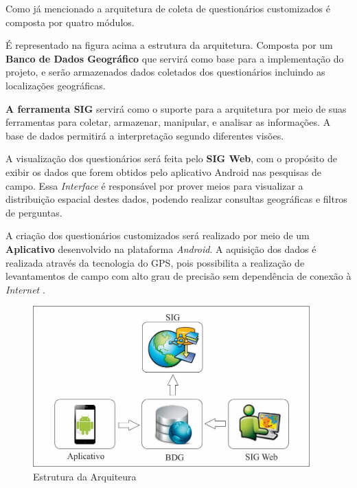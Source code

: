 \documentclass[
	12pt,				%
    oneside,			%
	a4paper,			%
	english,			%
	french,				%
	spanish,			%
	brazil,				%
	]{abntex2}
\begin{document}
Como já mencionado a arquitetura de coleta de questionários customizados é composta por quatro módulos.

É representado na figura acima a estrutura da arquitetura. Composta por um \textbf{Banco de Dados Geográfico} que servirá como base para a implementação do projeto, e serão armazenados dados coletados dos questionários incluindo as localizações geográficas.

\textbf{A ferramenta SIG} servirá como o suporte para a arquitetura por meio de suas ferramentas para coletar, armazenar, manipular, e analisar as informações. A base de dados permitirá a interpretação segundo diferentes visões. 

A visualização dos questionários será feita pelo \textbf{SIG Web}, com o propósito de exibir os dados que forem obtidos pelo aplicativo Android nas pesquisas de campo. Essa \textit{Interface} é responsável por prover meios para visualizar a distribuição espacial destes dados, podendo realizar consultas geográficas e filtros de perguntas.

A criação dos questionários customizados será realizado por meio de um \textbf{Aplicativo} desenvolvido na plataforma \textit{Android}. A aquisição dos dados é realizada através da tecnologia do GPS, pois possibilita a realização de levantamentos de campo com alto grau de precisão sem dependência de conexão à \textit{Internet} .

\begin{figure} [hbt] 
\label{figura1} 
\caption{Estrutura da Arquiteura}
\includegraphics[width=0.95\textwidth]{arquituraproposta.jpg} %
\end{figure}
\end{document}
